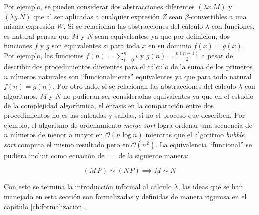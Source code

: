 Por ejemplo, se pueden considerar dos abstracciones diferentes \( (λx.M) \) y \( (λy.N) \) que al ser aplicadas a cualquier expresión \( Z \) sean \( β \)-convertibles a una misma expresión \( W \). Si se relacionan las abstracciones del cálculo \( λ \) con funciones, es natural pensar que \( M \) y \( N \) sean equivalentes, ya que por definición, dos funciones \( f \) y \( g \) son equivalentes si para toda \( x \) en su dominio \( f(x)=g(x) \). Por ejemplo, las funciones \( f(n)=\sum_{i=0}^{n}i \) y \( g(n)=\frac{n(n+1)}{2} \) a pesar de describir dos procedimientos diferentes para el cálculo de la suma de los primeros \( n \) números naturales son ``funcionalmente'' equivalentes ya que para todo natural \( f(n)=g(n) \). Por otro lado, si se relacionan las abstracciones del cálculo \( λ \) con algoritmos, \( M \) y \( N \) no pudieran ser consideradas equivalentes ya que en el estudio de la complejidad algorítmica, el énfasis en la comparación entre dos procedimientos no es las entradas y salidas, si no el proceso que describen. Por ejemplo, el algoritmo de ordenamiento \emph{merge sort} logra ordenar una secuencia de \( n \) números de menor a mayor en \( \mathcal{O}(n \log n) \) mientras que el algoritmo \emph{bubble sort} computa el mismo resultado pero en \( \mathcal{O}(n^2) \).  La equivalencia ``funcional'' se pudiera incluir como ecuación de \( = \) de la siguiente manera:

\[ (M\, P) \sim (N\, P) \implies M \sim N \]

Con esto se termina la introducción informal al cálculo \( λ \), las ideas que se han manejado en esta sección son formalizadas y definidas de manera rigurosa en el capítulo \ref{ch:formalizacion}.


